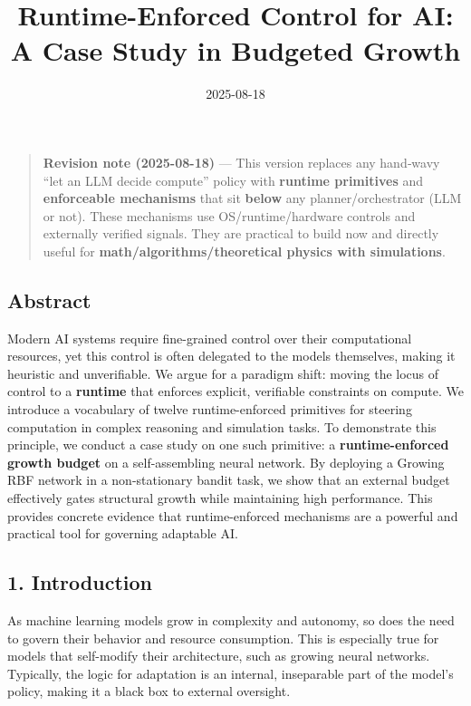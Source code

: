 \documentclass[
]{article}
\title{Runtime-Enforced Control for AI: A Case Study in Budgeted Growth}
\author{}
\date{2025-08-18}
\begin{document}
\maketitle

\begin{quote}
\textbf{Revision note (2025-08-18)} --- This version replaces any
hand‑wavy ``let an LLM decide compute'' policy with \textbf{runtime
primitives} and \textbf{enforceable mechanisms} that sit \textbf{below}
any planner/orchestrator (LLM or not). These mechanisms use
OS/runtime/hardware controls and externally verified signals. They are
practical to build now and directly useful for
\textbf{math/algorithms/theoretical physics with simulations}.
\end{quote}

\hypertarget{abstract}{%
\subsection{Abstract}\label{abstract}}

Modern AI systems require fine-grained control over their computational
resources, yet this control is often delegated to the models themselves,
making it heuristic and unverifiable. We argue for a paradigm shift:
moving the locus of control to a \textbf{runtime} that enforces
explicit, verifiable constraints on compute. We introduce a vocabulary
of twelve runtime-enforced primitives for steering computation in
complex reasoning and simulation tasks. To demonstrate this principle,
we conduct a case study on one such primitive: a
\textbf{runtime-enforced growth budget} on a self-assembling neural
network. By deploying a Growing RBF network in a non-stationary bandit
task, we show that an external budget effectively gates structural
growth while maintaining high performance. This provides concrete
evidence that runtime-enforced mechanisms are a powerful and practical
tool for governing adaptable AI.

\hypertarget{introduction}{%
\subsection{1. Introduction}\label{introduction}}

As machine learning models grow in complexity and autonomy, so does the
need to govern their behavior and resource consumption. This is
especially true for models that self-modify their architecture, such as
growing neural networks. Typically, the logic for adaptation is an
internal, inseparable part of the model's policy, making it a black box
to external oversight.
\end{document}
